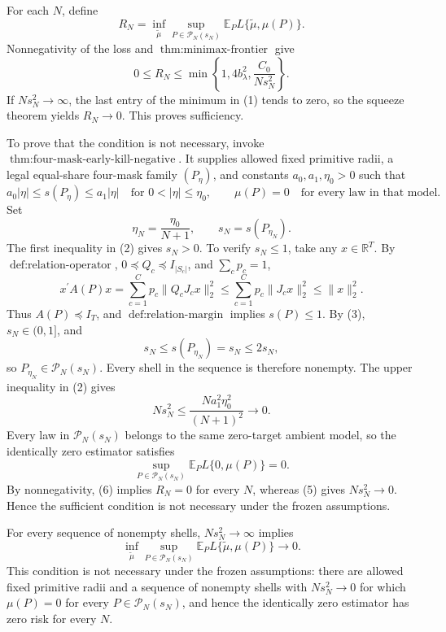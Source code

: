 For each \(N\), define
\[
R_N=
\inf_{\widetilde\mu}\sup_{P\in\mathcal P_N(s_N)}
\mathbb E_P L\{\widetilde\mu,\mu(P)\}.
\]
Nonnegativity of the loss and \(\operatorname{thm:minimax\text{-}frontier}\) give
\[
0\le R_N
\le \min\!\left\{1,4b_\lambda^2,\frac{C_0}{Ns_N^2}\right\}.
\tag{1}
\]
If \(Ns_N^2\to\infty\), the last entry of the minimum in (1) tends to zero, so the squeeze theorem yields \(R_N\to0\).  This proves sufficiency.

To prove that the condition is not necessary, invoke \(\operatorname{thm:four\text{-}mask\text{-}early\text{-}kill\text{-}negative}\).  It supplies allowed fixed primitive radii, a legal equal-share four-mask family \((P_\eta)\), and constants \(a_0,a_1,\eta_0>0\) such that
\[
a_0|\eta|\le s(P_\eta)\le a_1|\eta|
\quad\text{for }0<|\eta|\le\eta_0,
\qquad
\mu(P)=0
\quad\text{for every law in that model}.
\tag{2}
\]
Set
\[
\eta_N=\frac{\eta_0}{N+1},
\qquad
s_N=s(P_{\eta_N}).
\tag{3}
\]
The first inequality in (2) gives \(s_N>0\).  To verify \(s_N\le1\), take any \(x\in\mathbb R^T\).  By \(\operatorname{def:relation\text{-}operator}\), \(0\preceq Q_c\preceq I_{|S_c|}\), and \(\sum_cp_c=1\),
\[
x^{\prime}A(P)x
=\sum_{c=1}^Cp_c\|Q_cJ_cx\|_2^2
\le\sum_{c=1}^Cp_c\|J_cx\|_2^2
\le\|x\|_2^2.
\tag{4}
\]
Thus \(A(P)\preceq I_T\), and \(\operatorname{def:relation\text{-}margin}\) implies \(s(P)\le1\).  By (3), \(s_N\in(0,1]\), and
\[
s_N\le s(P_{\eta_N})=s_N\le2s_N,
\]
so \(P_{\eta_N}\in\mathcal P_N(s_N)\).  Every shell in the sequence is therefore nonempty.  The upper inequality in (2) gives
\[
Ns_N^2
\le \frac{Na_1^2\eta_0^2}{(N+1)^2}
\longrightarrow0.
\tag{5}
\]
Every law in \(\mathcal P_N(s_N)\) belongs to the same zero-target ambient model, so the identically zero estimator satisfies
\[
\sup_{P\in\mathcal P_N(s_N)}
\mathbb E_PL\{0,\mu(P)\}=0.
\tag{6}
\]
By nonnegativity, (6) implies \(R_N=0\) for every \(N\), whereas (5) gives \(Ns_N^2\to0\).  Hence the sufficient condition is not necessary under the frozen assumptions.

For every sequence of nonempty shells, \(Ns_N^2\to\infty\) implies
\[
\inf_{\widetilde\mu}\sup_{P\in\mathcal P_N(s_N)}
\mathbb E_P L\{\widetilde\mu,\mu(P)\}\longrightarrow0.
\]
This condition is not necessary under the frozen assumptions: there are allowed fixed primitive radii and a sequence of nonempty shells with \(Ns_N^2\to0\) for which \(\mu(P)=0\) for every \(P\in\mathcal P_N(s_N)\), and hence the identically zero estimator has zero risk for every \(N\).
